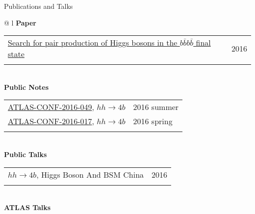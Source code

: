 \documentclass[letterpaper,11pt,oneside]{article}
\newcommand{\blue}[1]{\textcolor[rgb]{0,0,0.9}{#1}}
\begin{document}
\raggedright
 \Large{Publications and Talks} \\
\vspace{-0.5cm}
\normalsize
\begin{flushleft}
\hspace{1cm}
 \begin{tabular}{@{} l}
    \textbf{Paper} \\ 
    \begin{tabular}{@{} l l }
    \blue{\href{http://arxiv.org/abs/1606.04782}{Search for pair production of Higgs bosons in the $b\bar{b}b\bar{b}$ final state}} & 2016 \\
    \hspace{0.8\linewidth} & \hspace{0.1\linewidth} \\
     \end{tabular}
     \\
    \textbf{Public Notes} \\ 
    \begin{tabular}{@{} l l }
    \blue{\href{https://atlas.web.cern.ch/Atlas/GROUPS/PHYSICS/CONFNOTES/ATLAS-CONF-2016-049/}{ATLAS-CONF-2016-049}}, $hh\to4b$ & 2016 summer\\
    \blue{\href{https://atlas.web.cern.ch/Atlas/GROUPS/PHYSICS/CONFNOTES/ATLAS-CONF-2016-017/}{ATLAS-CONF-2016-017}}, $hh\to4b$ & 2016 spring\\
    \hspace{0.8\linewidth} & \hspace{0.1\linewidth} \\
     \end{tabular}
     \\
     \textbf{Public Talks} \\
     \begin{tabular}{@{} l l }
     \blue{\href{http://indico.ihep.ac.cn/event/5635/session/86/contribution/40}{$hh\to4b$}}, Higgs Boson And BSM China & 2016\\
    \hspace{0.8\linewidth} & \hspace{0.1\linewidth} \\
      \end{tabular}
     \\
     \textbf{ATLAS Talks} \\

\end{tabular}
\end{flushleft}
\end{document}
